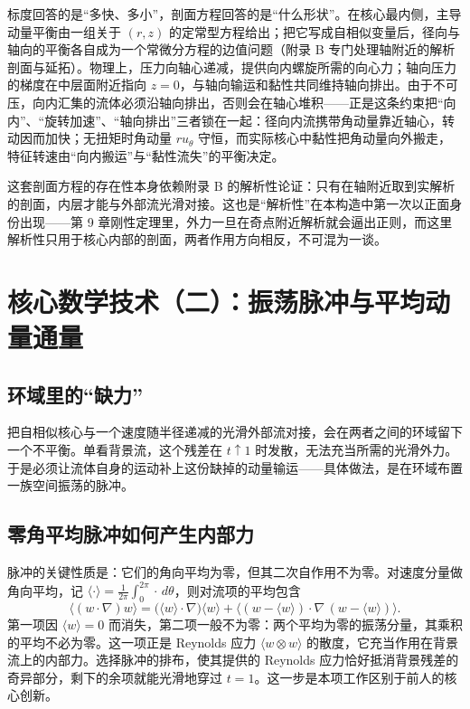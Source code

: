 标度回答的是“多快、多小”，剖面方程回答的是“什么形状”。在核心最内侧，主导动量平衡由一组关于 $(r,z)$ 的定常型方程给出；把它写成自相似变量后，径向与轴向的平衡各自成为一个常微分方程的边值问题（附录 B 专门处理轴附近的解析剖面与延拓）。物理上，压力向轴心递减，提供向内螺旋所需的向心力；轴向压力的梯度在中层面附近指向 $z=0$，与轴向输运和黏性共同维持轴向排出。由于不可压，向内汇集的流体必须沿轴向排出，否则会在轴心堆积——正是这条约束把“向内”、“旋转加速”、“轴向排出”三者锁在一起：径向内流携带角动量靠近轴心，转动因而加快；无扭矩时角动量 $ru_{\theta}$ 守恒，而实际核心中黏性把角动量向外搬走，特征转速由“向内搬运”与“黏性流失”的平衡决定。

这套剖面方程的存在性本身依赖附录 B 的解析性论证：只有在轴附近取到实解析的剖面，内层才能与外部流光滑对接。这也是“解析性”在本构造中第一次以正面身份出现——第 9 章刚性定理里，外力一旦在奇点附近解析就会逼出正则，而这里解析性只用于核心内部的剖面，两者作用方向相反，不可混为一谈。

\section{核心数学技术（二）：振荡脉冲与平均动量通量}

\subsection{环域里的“缺力”}

把自相似核心与一个速度随半径递减的光滑外部流对接，会在两者之间的环域留下一个不平衡。单看背景流，这个残差在 $t\uparrow1$ 时发散，无法充当所需的光滑外力。于是必须让流体自身的运动补上这份缺掉的动量输运——具体做法，是在环域布置一族空间振荡的脉冲。

\subsection{零角平均脉冲如何产生内部力}

脉冲的关键性质是：它们的角向平均为零，但其二次自作用不为零。对速度分量做角向平均，记 $\langle\cdot\rangle=\frac{1}{2\pi}\int_{0}^{2\pi}\cdot\,d\theta$，则对流项的平均包含
\begin{equation}
\big\langle (w\cdot\nabla)w\big\rangle
=\big(\langle w\rangle\cdot\nabla\big)\langle w\rangle
+\big\langle (w-\langle w\rangle)\cdot\nabla\,(w-\langle w\rangle)\big\rangle .
\end{equation}
第一项因 $\langle w\rangle=0$ 而消失，第二项一般不为零：两个平均为零的振荡分量，其乘积的平均不必为零。这一项正是 Reynolds 应力 $\langle w\otimes w\rangle$ 的散度，它充当作用在背景流上的内部力。选择脉冲的排布，使其提供的 Reynolds 应力恰好抵消背景残差的奇异部分，剩下的余项就能光滑地穿过 $t=1$。这一步是本项工作区别于前人的核心创新。

